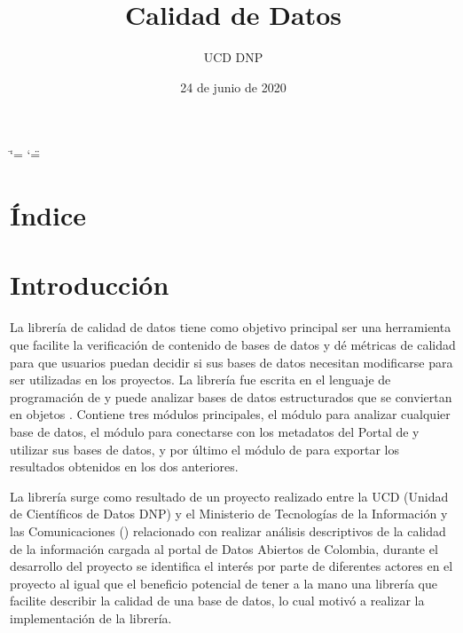 \documentclass[letterpaper,10pt,openany,spanish]{sphinxmanual}
\title{Calidad de Datos}
\date{24 de junio de 2020}
\author{UCD \sphinxhyphen{} DNP}
\begin{document}
\ifdefined\shorthandoff
  \ifnum\catcode`\=\string=\active\shorthandoff{=}\fi
  \ifnum\catcode`\"=\active{}\fi
\fi

\pagestyle{empty}
\sphinxmaketitle
\pagestyle{plain}
\sphinxtableofcontents
\pagestyle{normal}
\label{\detokenize{index::doc}}



\chapter{Índice}
\label{\detokenize{genindex:indice}}\label{\detokenize{genindex:genindex}}\label{\detokenize{genindex::doc}}

\chapter{Introducción}
\label{\detokenize{introduccion:introduccion}}\label{\detokenize{introduccion::doc}}
La librería de calidad de datos tiene como objetivo principal ser una herramienta que facilite la verificación de contenido de bases de datos y dé métricas de calidad para que usuarios puedan decidir si sus bases de datos necesitan modificarse para ser utilizadas en los proyectos. La librería fue escrita en el lenguaje de programación de  y puede analizar bases de datos estructurados que se conviertan en objetos . Contiene tres módulos principales, el módulo {\hyperref[\detokenize{datos:datos}]{}} para analizar cualquier base de datos, el módulo {\hyperref[\detokenize{metadatos:metadatos}]{}} para conectarse con los metadatos del Portal de  y utilizar sus bases de datos, y por último el módulo de {\hyperref[\detokenize{reporte:reporte}]{}} para exportar los resultados obtenidos en los dos anteriores.

La librería surge como resultado de un proyecto realizado entre la UCD (Unidad de Científicos de Datos \sphinxhyphen{} DNP) y el Ministerio de Tecnologías de la Información y las Comunicaciones () relacionado con realizar análisis descriptivos de la calidad de la información cargada al portal de Datos Abiertos de Colombia, durante el desarrollo del proyecto se identifica el interés por parte de diferentes actores en el proyecto al igual que el beneficio potencial de tener a la mano una librería que facilite describir la calidad de una base de datos, lo cual motivó a realizar la implementación de la librería.
\end{document}
